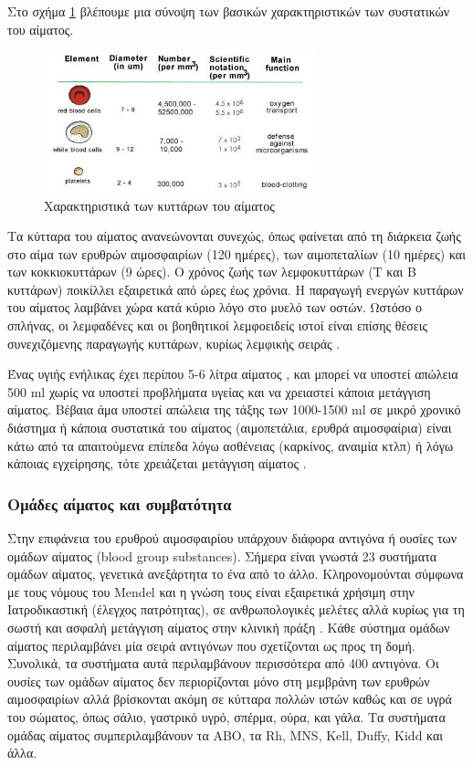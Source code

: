 	Στο σχήμα \ref{fig:blood_cells_characteristics} βλέπουμε μια σύνοψη των βασικών χαρακτηριστικών των συστατικών του αίματος.
\begin{figure}[H]
	    \centering
	    \includegraphics[width=0.7\textwidth]{blood_cells_characteristics.jpg}
	    \caption{Χαρακτηριστικά των κυττάρων του αίματος}
	    \label{fig:blood_cells_characteristics}
\end{figure}

	Τα κύτταρα του αίματος ανανεώνονται συνεχώς, όπως φαίνεται από τη διάρκεια ζωής στο αίμα των ερυθρών αιμοσφαιρίων (120 ημέρες), των αιμοπεταλίων (10 ημέρες) και των κοκκιοκυττάρων (9 ώρες). Ο χρόνος ζωής των λεμφοκυττάρων (Τ και Β κυττάρων) ποικίλλει εξαιρετικά από ώρες έως χρόνια. Η παραγωγή ενεργών κυττάρων του αίματος λαμβάνει χώρα κατά κύριο λόγο στο μυελό των οστών. Ωστόσο ο σπλήνας, οι λεμφαδένες και οι βοηθητικοί λεμφοειδείς ιστοί είναι επίσης θέσεις συνεχιζόμενης παραγωγής κυττάρων, κυρίως λεμφικής σειράς \cite{textbookOfMedicine}.
	
	Ένας υγιής ενήλικας έχει περίπου 5-6 λίτρα αίματος \cite{bloodVolume}, και μπορεί να υποστεί απώλεια 500 ml χωρίς να υποστεί προβλήματα υγείας και να χρειαστεί κάποια μετάγγιση αίματος. Βέβαια άμα υποστεί απώλεια της τάξης των 1000-1500 ml σε μικρό χρονικό διάστημα ή κάποια συστατικά του αίματος (αιμοπετάλια, ερυθρά αιμοσφαίρια) είναι κάτω από τα απαιτούμενα επίπεδα λόγω ασθένειας (καρκίνος, αναιμία κτλπ) ή λόγω κάποιας εγχείρησης, τότε χρειάζεται μετάγγιση αίματος \cite{Stainsby01092000}.
		\subsubsection{Ομάδες αίματος και συμβατότητα}	
			Στην επιφάνεια του ερυθρού αιμοσφαιρίου υπάρχουν διάφορα αντιγόνα ή ουσίες των ομάδων αίματος (blood group substances). Σήμερα είναι γνωστά 23 συστήματα ομάδων αίματος, γενετικά ανεξάρτητα το ένα από το άλλο. Κληρονομούνται σύμφωνα με τους νόμους του Mendel και η γνώση τους είναι εξαιρετικά χρήσιμη στην Ιατροδικαστική (έλεγχος πατρότητας), σε ανθρωπολογικές μελέτες αλλά κυρίως για τη σωστή και ασφαλή μετάγγιση αίματος στην κλινική πράξη \cite{dawkins}. Κάθε σύστημα ομάδων αίματος περιλαμβάνει μία σειρά αντιγόνων που σχετίζονται ως προς τη δομή. Συνολικά, τα συστήματα αυτά περιλαμβάνουν περισσότερα από 400 αντιγόνα. Οι ουσίες των ομάδων αίματος δεν περιορίζονται μόνο στη μεμβράνη των ερυθρών αιμοσφαιρίων αλλά βρίσκονται ακόμη σε κύτταρα πολλών ιστών καθώς και σε υγρά του σώματος, όπως σάλιο, γαστρικό υγρό, σπέρμα, ούρα, και γάλα. Τα συστήματα ομάδας αίματος συμπεριλαμβάνουν τα ΑΒΟ, τα Rh, MNS, Kell, Duffy, Kidd και άλλα.
			
